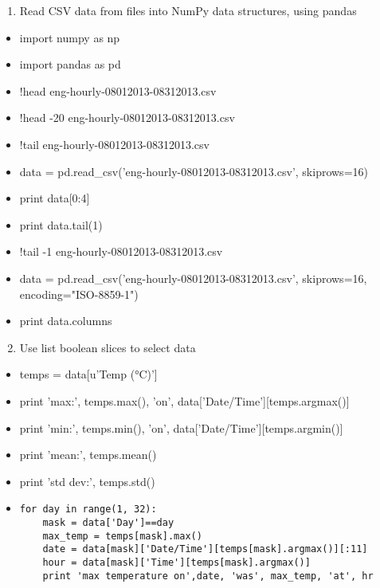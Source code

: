 \documentclass[xcolor=dvipsnames]{beamer}
\begin{document}
\begin{frame}
\begin{enumerate}
\item  Read CSV data from files into NumPy data structures,
using pandas
\end{enumerate}
\begin{itemize}
\item import numpy as np
\item import pandas as pd
\item !head eng-hourly-08012013-08312013.csv
\item !head -20 eng-hourly-08012013-08312013.csv
\item !tail eng-hourly-08012013-08312013.csv
\item data = pd.read\_csv('eng-hourly-08012013-08312013.csv', skiprows=16)
\item print data[0:4]
\item print data.tail(1)
\item !tail -1 eng-hourly-08012013-08312013.csv
\item data = pd.read\_csv('eng-hourly-08012013-08312013.csv', skiprows=16, encoding="ISO-8859-1")
\item print data.columns
\end{itemize}
\end{frame}

\begin{frame}[fragile]
\begin{enumerate}
\setcounter{enumi}{1}
\item Use list boolean slices to select data
\end{enumerate}
\begin{itemize}
\item temps = data[u'Temp (°C)']
\item print 'max:', temps.max(), 'on', data['Date/Time'][temps.argmax()]
\item print 'min:', temps.min(), 'on', data['Date/Time'][temps.argmin()]
\item print 'mean:', temps.mean()
\item print 'std dev:', temps.std()
\item {\small
\begin{verbatim}
for day in range(1, 32):
    mask = data['Day']==day
    max_temp = temps[mask].max()
    date = data[mask]['Date/Time'][temps[mask].argmax()][:11]
    hour = data[mask]['Time'][temps[mask].argmax()]    
    print 'max temperature on',date, 'was', max_temp, 'at', hr
\end{verbatim}}
\end{itemize}
\end{frame}
\end{document}
